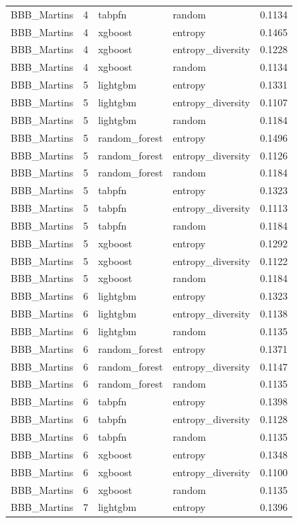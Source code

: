 \begin{tabular}{lrllr}
BBB_Martins & 4 & tabpfn & random & 0.1134 \\
BBB_Martins & 4 & xgboost & entropy & 0.1465 \\
BBB_Martins & 4 & xgboost & entropy_diversity & 0.1228 \\
BBB_Martins & 4 & xgboost & random & 0.1134 \\
BBB_Martins & 5 & lightgbm & entropy & 0.1331 \\
BBB_Martins & 5 & lightgbm & entropy_diversity & 0.1107 \\
BBB_Martins & 5 & lightgbm & random & 0.1184 \\
BBB_Martins & 5 & random_forest & entropy & 0.1496 \\
BBB_Martins & 5 & random_forest & entropy_diversity & 0.1126 \\
BBB_Martins & 5 & random_forest & random & 0.1184 \\
BBB_Martins & 5 & tabpfn & entropy & 0.1323 \\
BBB_Martins & 5 & tabpfn & entropy_diversity & 0.1113 \\
BBB_Martins & 5 & tabpfn & random & 0.1184 \\
BBB_Martins & 5 & xgboost & entropy & 0.1292 \\
BBB_Martins & 5 & xgboost & entropy_diversity & 0.1122 \\
BBB_Martins & 5 & xgboost & random & 0.1184 \\
BBB_Martins & 6 & lightgbm & entropy & 0.1323 \\
BBB_Martins & 6 & lightgbm & entropy_diversity & 0.1138 \\
BBB_Martins & 6 & lightgbm & random & 0.1135 \\
BBB_Martins & 6 & random_forest & entropy & 0.1371 \\
BBB_Martins & 6 & random_forest & entropy_diversity & 0.1147 \\
BBB_Martins & 6 & random_forest & random & 0.1135 \\
BBB_Martins & 6 & tabpfn & entropy & 0.1398 \\
BBB_Martins & 6 & tabpfn & entropy_diversity & 0.1128 \\
BBB_Martins & 6 & tabpfn & random & 0.1135 \\
BBB_Martins & 6 & xgboost & entropy & 0.1348 \\
BBB_Martins & 6 & xgboost & entropy_diversity & 0.1100 \\
BBB_Martins & 6 & xgboost & random & 0.1135 \\
BBB_Martins & 7 & lightgbm & entropy & 0.1396 \\

\end{tabular}
